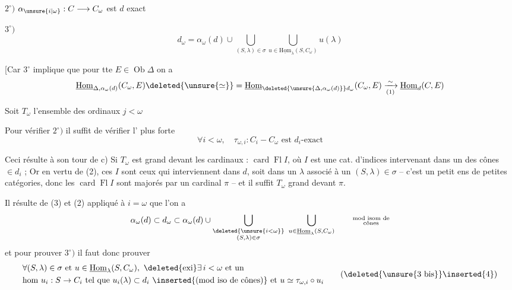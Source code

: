 $2^\circ)$ $\alpha_{\unsure{i|\omega}}:C\longrightarrow C_\omega$ est $d$ exact

$3^\circ)$ 
\[
 d_\omega=\alpha_\omega(d)\cup\bigcup_{(S,\lambda)\in\sigma}
 \bigcup_{u\in\underline{\mathrm{Hom}}_\lambda(S,C_\omega)}u(\lambda)
\]

[Car $3^\circ$ implique que pour tte $E\in\operatorname{Ob}\Delta$ on a
\[
 \underline{\mathrm{Hom}}_{\Delta,\alpha_\omega(d)}(C_\omega,E)\deleted{\unsure{\simeq}}=
 \underline{\mathrm{Hom}}_{\deleted{\unsure{\Delta,\alpha_\omega(d)}}d_\omega}(C_\omega,E)
 \xrightarrow[(1)]{\sim}\underline{\mathrm{Hom}}_d(C,E)
\]

 Soit $T_\omega$ l'ensemble des ordinaux $j<\omega$

Pour vérifier $2^\circ)$ il suffit de vérifier l' plus forte
\[
 \forall i<\omega,\quad\tau_{\omega,i}:C_i-C_\omega\text{ est }d_i\text{-exact}\tag*{(3)}
\]

Ceci résulte à son tour de c) Si $T_\omega$ est grand devant les cardinaux : $\operatorname{card}\operatorname{Fl} I$, où $I$ est une cat. d'indices intervenant dans un des cônes $\in d_i$ ; Or en vertu de (2), ces $I$  sont  ceux qui interviennent dans $d$, soit dans un $\lambda$ associé à un $(S,\lambda)\in\sigma$ -- c'est un petit ens de petites catégories, donc les $\operatorname{card}\operatorname{Fl}I$ sont majorés par un cardinal $\pi$ -- et il suffit $T_\omega$ grand devant $\pi$.


Il résulte de (3) et (2) appliqué à $i=\omega$ que l'on a
\[
 \alpha_\omega(d)\subset d_\omega\subset\alpha_\omega(d)\cup
 \bigcup_{\substack{\deleted{\unsure{i<\omega}}\\(S,\lambda)\in\sigma}}
 \ \bigcup_{u\in\underline{\mathrm{Hom}}_\lambda(S,C_\omega)}
 \qquad\substack{\text{mod isom de}\\\text{cônes}}
\]
et pour prouver $3^\circ)$ il faut donc prouver
\[
 \begin{aligned}
 &\forall(S,\lambda)\in\sigma\text{ et }u\in\underline{\mathrm{Hom}}_\lambda(S,C_\omega),
 \ \deleted{\text{exi}}\exists\,i<\omega\text{ et un}\\
 &\text{hom }u_i:S\to C_i\text{ tel que }u_i(\lambda)\subset d_i\ \inserted{\text{(mod iso de cônes)}}
 \text{ et }u\simeq\tau_{\omega,i}\circ u_i
 \end{aligned}\tag*{(\deleted{\unsure{3 bis}}\inserted{4})}
\]

